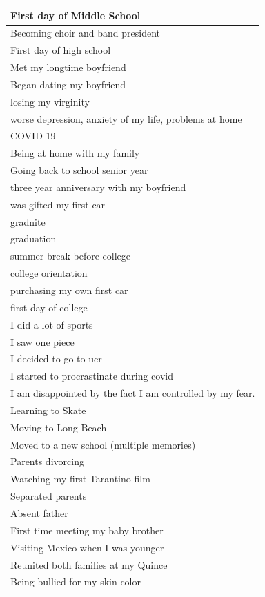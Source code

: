 \documentclass[
  .7em,
  letterpaper,
  DIV=11,
  numbers=noendperiod]{scrartcl}
\begin{document}
\begin{table}
\begin{tabular}{l}
\hline
First day of Middle School\\
\hline
Becoming choir and band president\\
\hline
First day of high school\\
\hline
Met my longtime boyfriend\\
\hline
Began dating my boyfriend\\
\hline
losing my virginity\\
\hline
worse depression, anxiety of my life, problems at home\\
\hline
COVID-19\\
\hline
Being at home with my family\\
\hline
Going back to school senior year\\
\hline
three year anniversary with my boyfriend\\
\hline
was gifted my first car\\
\hline
gradnite\\
\hline
graduation\\
\hline
summer break before college\\
\hline
college orientation\\
\hline
purchasing my own first car\\
\hline
first day of college\\
\hline
I did a lot of sports\\
\hline
I saw one piece\\
\hline
I decided to go to ucr\\
\hline
I started to procrastinate during covid\\
\hline
I am disappointed by the fact I am controlled by my fear.\\
\hline
Learning to Skate\\
\hline
Moving to Long Beach\\
\hline
Moved to a new school (multiple memories)\\
\hline
Parents divorcing\\
\hline
Watching my first Tarantino film\\
\hline
Separated parents\\
\hline
Absent father\\
\hline
First time meeting my baby brother\\
\hline
Visiting Mexico when I was younger\\
\hline
Reunited both families at my Quince\\
\hline
Being bullied for my skin color\\
\hline

\end{tabular}
\end{table}
\end{document}
